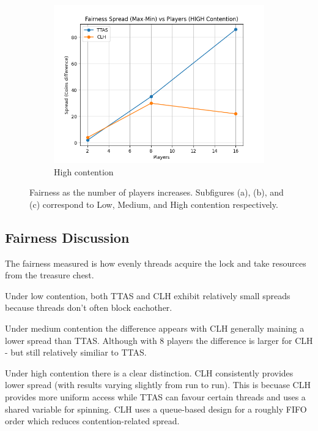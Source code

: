 \documentclass[12pt,a4paper]{article}
\begin{document}
\begin{figure}[H]
  \vspace{0.5em}
  \begin{subfigure}{0.65\textwidth}
    \centering
    \includegraphics[width=\linewidth]{plot_fairness_HIGH.png}
    \caption{High contention}
    \label{fig:fairness-high}
  \end{subfigure}
  
  \caption{Fairness as the number of players increases. Subfigures (a), (b), and (c) correspond to Low, Medium, and High contention respectively.}
  \label{fig:fairness-plots}
\end{figure}

\clearpage
\subsection{Fairness Discussion}
The fairness measured is how evenly threads acquire the lock and take resources from the treasure chest.

Under low contention, both TTAS and CLH exhibit relatively small spreads because threads don't often block eachother.

Under medium contention the difference appears with CLH generally maining a lower spread than TTAS. Although with 8 players the difference is larger for CLH - but still relatively similiar to TTAS.

Under high contention there is a clear distinction. CLH consistently provides lower spread (with results varying slightly from run to run). This is becuase CLH provides more uniform access while TTAS can favour certain threads and uses a shared variable for spinning. CLH uses a queue-based design for a roughly FIFO order which reduces contention-related spread.
\end{document}

